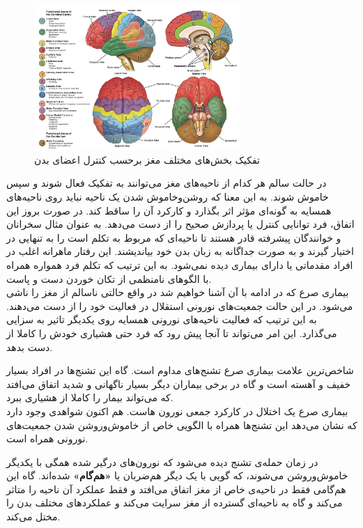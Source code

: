 \begin{figure}
	\centering
	\includegraphics[width=0.7\textwidth]{../Figures/neuroanatomy_plot.jpg}
	\caption{
		تفکیک بخش‌های مختلف مغز برحسب کنترل اعضای بدن
		\cite{penttila_2022}
	}
	\label{fig:brain_anatomy}
\end{figure}

 در حالت سالم هر کدام از ناحیه‌های مغز می‌توانند به تفکیک فعال شوند و سپس خاموش شوند. به این معنا که روشن‌وخاموش شدن یک ناحیه نباید روی ناحیه‌های همسایه به گونه‌ای مؤثر اثر بگذارد و کارکرد آن را ساقط کند. در صورت بروز این اتفاق، فرد توانایی کنترل یا پردازش صحیح را از دست می‌دهد. به عنوان مثال سخرانان و خوانندگان پیشرفته قادر هستند تا ناحیه‌ای که مربوط به تکلم است را به تنهایی در اختیار گیرند و به صورت جداگانه به زبان بدن خود بیاندیشند. این رفتار ماهرانه اغلب در افراد مقدماتی یا دارای بیماری دیده نمی‌شود. به این ترتیب که تکلم فرد همواره همراه با الگوهای نامنظمی از تکان خوردن دست و پاست.\\
 
 بیماری صرع که در ادامه با آن آشنا خواهیم شد در واقع حالتی ناسالم از مغز را ناشی می‌شود. در این حالت جمعیت‌های نورونی استقلال در فعالیت خود را از دست می‌دهند. به این ترتیب که فعالیت ناحیه‌های نورونی همسایه روی یکدیگر تاثیر به سزایی می‌گذارد. این امر می‌تواند تا آنجا پیش رود که فرد حتی هشیاری خودش را کاملا از دست بدهد.

شاخص‌ترین علامت بیماری صرع تشنج‌های مداوم است. گاه این تشنج‌ها در افراد بسیار خفیف و آهسته است و گاه در برخی بیماران دیگر بسیار ناگهانی و شدید اتفاق می‌افتد که می‌تواند بیمار را کاملا از هشیاری ببرد.\\

بیماری صرع یک اختلال در کارکرد جمعی نورون هاست. هم اکنون شواهدی وجود دارد که نشان می‌دهد این تشنج‌ها همراه با الگویی خاص از خاموش‌وروشن شدن جمعیت‌های نورونی همراه است. 

در زمان حمله‌ی تشنج دیده می‌شود که نورون‌های درگیر شده همگی با یکدیگر خاموش‌وروشن می‌شوند، که گویی با یک دیگر هم‌ضربان یا \textbf{«هم‌گام»} شده‌اند. گاه این هم‌گامی فقط در ناحیه‌ی خاص از مغز اتفاق می‌افتد و فقط عملکرد آن ناحیه را متاثر می‌کند و گاه به ناحیه‌ای گسترده از مغز سرایت می‌کند و عملکردهای مختلف بدن را مختل می‌کند.\\

